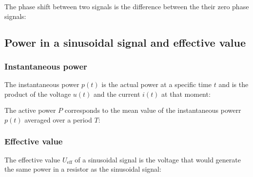 \documentclass{article}
\begin{document}
The phase shift between two signals is the difference between the
their zero phase signals:

\begin{center}
\end{center}

\subsection{Power in a sinusoidal signal and effective value}
\subsubsection{Instantaneous power}
The instantaneous power $p(t)$ is the actual power at a specific time
$t$ and is the product of the voltage $u(t)$ and the current $i(t)$
at that moment:


The active power $P$ corresponds to the mean value of the instantaneous
powerr $p(t)$ averaged over a period $T$:

\newpage
\subsubsection{Effective value}
The effective value $U_{\text{eff}}$ of a sinusoidal signal is the
voltage that would generate the same power in a resistor as the
sinusoidal signal:
\end{document}
